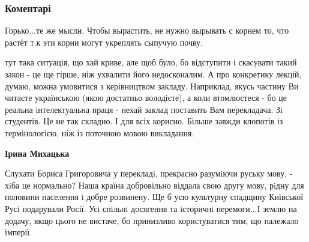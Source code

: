  
 
 
 
 
\subsubsection{Коментарі}

\begin{itemize}
 

Горько...те же мысли. Чтобы вырастить, не нужно вырывать с корнем то, что
растёт т.к эти корни могут укреплять сыпучую почву.


 

тут така ситуація, що хай криве, але щоб було, бо відступити і скасувати такий
закон - це ще гірше, ніж ухвалити його недосконалим. А про конкретику лекцій,
думаю, можна умовитися з керівництвом закладу. Наприклад, якусь частину Ви
читаєте українською (якою достатньо володієте), а коли втомлюєтеся - бо це
реальна інтелектуальна праця - нехай заклад поставить Вам перекладача. Зі
студентів. Це не так складно. І для всіх корисно. Більше завжди клопотів із
термінологією, ніж із поточною мовою викладання.

\begin{itemize}
 
\textbf{Ірина Михацька} 

Слухати Бориса Григоровича у перекладi, прекрасно разумiючи руську мову, - хiба
це нормально? Наша країна добровільно віддала свою другу мову, рiдну для
половини населення i добре розвинену. Ще б усю культурну спадщину Київської
Русі подарували Росії. Усi спiльнi досягення та iсторичнi перемоги...I землю на
додачу, якщо цього не вистаче, бо принизливо користуватися тим, що належало
імперії.



\end{itemize}
\end{itemize}
